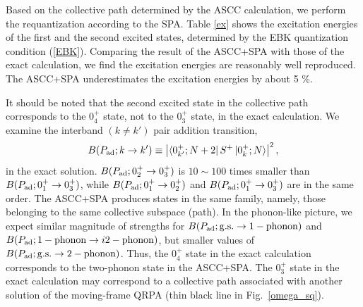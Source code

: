 \documentclass[%
superscriptaddress,
showpacs,
nofootinbib,
amsmath,amssymb,
aps,
prc,
twocolumn,
floatfix ]%
{revtex4-1}
\begin{document}
Based on the collective path determined by the ASCC calculation,
we perform the requantization according to the SPA.
Table \ref{ex} shows the excitation energies of the first and the second
excited states, determined by the EBK quantization condition (\ref{EBK}).
Comparing the result of the ASCC+SPA with those of the exact calculation,
we find the excitation energies are reasonably well reproduced. 
The ASCC+SPA underestimates the excitation energies by about 5 \%.

It should be noted that the second excited state in the collective path
corresponds to the $0_4^+$ state,
not to the $0_3^+$ state, in the exact calculation. 
We examine the interband $(k\neq k')$ pair addition transition,
\begin{equation}
B(P_{\rm ad};k\rightarrow k') \equiv 
	\left|\bra{0_{k'}^+;N+2} S^+ \ket{0_k^+;N}\right|^2 ,
\label{BPad}
\end{equation}
in the exact solution.
$B(P_{\rm ad};0_2^+\rightarrow 0_3^+)$ 
is $10\sim100$ times smaller than $B(P_{\rm ad};0_1^+\rightarrow 0_3^+)$,
while $B(P_{\rm ad};0_1^+\rightarrow 0_2^+)$ and
$B(P_{\rm ad};0_1^+\rightarrow 0_3^+)$ are in the same order.
The ASCC+SPA produces states in the same family,
namely, those belonging to the same collective subspace (path).
In the phonon-like picture,
we expect similar magnitude of strengths for
$B(P_{\rm ad};{\rm g.s.}\rightarrow {\rm 1-phonon})$
and
$B(P_{\rm ad};{\rm 1-phonon}\rightarrow i{\rm 2-phonon})$,
but smaller values of
$B(P_{\rm ad};{\rm g.s.}\rightarrow {\rm 2-phonon})$.
Thus, the $0_4^+$ state in the exact calculation
corresponds to the two-phonon state in the ASCC+SPA.
The $0_3^+$ state in the exact calculation may correspond to
a collective path associated with another solution of the moving-frame QRPA
(thin black line in Fig.~\ref{omega_sq}).

\end{document}

